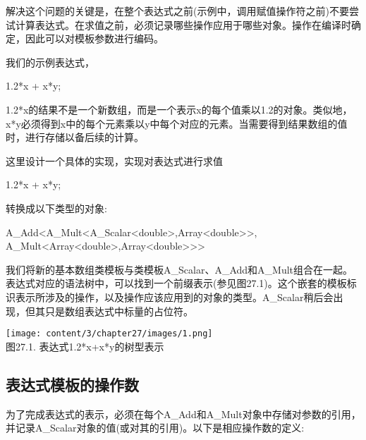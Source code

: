 
解决这个问题的关键是，在整个表达式之前(示例中，调用赋值操作符之前)不要尝试计算表达式。在求值之前，必须记录哪些操作应用于哪些对象。操作在编译时确定，因此可以对模板参数进行编码。

我们的示例表达式，

\begin{cpp}
1.2*x + x*y;
\end{cpp}

1.2*x的结果不是一个新数组，而是一个表示x的每个值乘以1.2的对象。类似地，x*y必须得到x中的每个元素乘以y中每个对应的元素。当需要得到结果数组的值时，进行存储以备后续的计算。

这里设计一个具体的实现，实现对表达式进行求值

\begin{cpp}
1.2*x + x*y;
\end{cpp}

转换成以下类型的对象:

\begin{cpp}
A_Add<A_Mult<A_Scalar<double>,Array<double>>,
	  A_Mult<Array<double>,Array<double>>>
\end{cpp}

我们将新的基本数组类模板与类模板A\_Scalar、A\_Add和A\_Mult组合在一起。表达式对应的语法树中，可以找到一个前缀表示(参见图27.1)。这个嵌套的模板标识表示所涉及的操作，以及操作应该应用到的对象的类型。A\_Scalar稍后会出现，但其只是数组表达式中标量的占位符。

\begin{center}
\texttt{[image: content/3/chapter27/images/1.png]} \\
图27.1. 表达式1.2*x+x*y的树型表示
\end{center}

\subsection{表达式模板的操作数}

为了完成表达式的表示，必须在每个A\_Add和A\_Mult对象中存储对参数的引用，并记录A\_Scalar对象的值(或对其的引用)。以下是相应操作数的定义:

